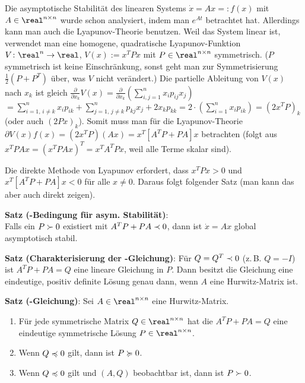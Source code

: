 Die asymptotische Stabilität des linearen Systems $\dot{x} = Ax =: f(x)$ mit
$A \in \real^{n \times n}$ wurde schon analysiert, indem man $e^{At}$ betrachtet hat.
Allerdings kann man auch die Lyapunov-Theorie benutzen.
Weil das System linear ist, verwendet man eine homogene, quadratische Lyapunov-Funktion
$V\colon \real^n \rightarrow \real$, $V(x) := x^T Px$ mit $P \in \real^{n \times n}$
symmetrisch.
($P$ symmetrisch ist keine Einschränkung, sonst geht man zur Symmetrisierung
$\frac{1}{2} (P + P^T)$ über, was $V$ nicht verändert.)
Die partielle Ableitung von $V(x)$ nach $x_k$ ist gleich
$\frac{\partial}{\partial x_k} V(x)
= \frac{\partial}{\partial x_k} (\sum_{i,j=1}^n x_i p_{ij} x_j)$\\
$= \sum_{i=1,\,i\not=k}^n x_i p_{ik} + \sum_{j=1,\,j\not=k}^n p_{kj} x_j + 2 x_k p_{kk}
= 2 \cdot (\sum_{i=1}^n x_i p_{ik})
= (2 x^T P)_k$
(oder auch $(2Px)_k$).
Somit muss man für die Lyapunov-Theorie
$\partial V(x) f(x) = (2 x^T P) (Ax) = x^T [A^T P + PA] x$ betrachten
(folgt aus $x^T P Ax = (x^T P Ax)^T = x^T A^T P x$,
weil alle Terme skalar sind).

\linie

Die direkte Methode von Lyapunov erfordert, dass $x^T P x > 0$ und
$x^T [A^T P + PA] x < 0$ für alle $x \not= 0$.
Daraus folgt folgender Satz
(man kann das aber auch direkt zeigen).

\textbf{Satz (-Bedingung für asym. Stabilität)}:\\
Falls ein $P \succ 0$ existiert mit $A^T P + PA \prec 0$, dann ist
$\dot{x} = Ax$ global asymptotisch stabil.

\textbf{Satz (Charakterisierung der -Gleichung)}:
Für $Q = Q^T \prec 0$ (z.\,B. $Q = -I$) ist $A^T P + PA = Q$ eine lineare Gleichung in $P$.
Dann besitzt die Gleichung eine eindeutige, positiv definite Lösung genau dann, wenn
$A$ eine Hurwitz-Matrix ist.

\textbf{Satz (-Gleichung)}:
Sei $A \in \real^{n \times n}$ eine Hurwitz-Matrix.
\begin{enumerate}
    \item
    Für jede symmetrische Matrix $Q \in \real^{n \times n}$
    hat die  $A^T P + PA = Q$
    eine eindeutige symmetrische Lösung $P \in \real^{n \times n}$.
    
    \item
    Wenn $Q \preccurlyeq 0$ gilt, dann ist $P \succcurlyeq 0$.
    
    \item
    Wenn $Q \preccurlyeq 0$ gilt und $(A, Q)$ beobachtbar ist, dann ist $P \succ 0$.
\end{enumerate}

